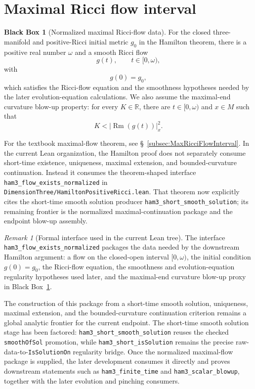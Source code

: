 \documentclass[11pt]{article}
\theoremstyle{plain}
\theoremstyle{definition}
\newtheorem{blackbox}[theorem]{Black Box}
\theoremstyle{remark}
\newtheorem{remark}[theorem]{Remark}
\newcommand{\Rm}{\operatorname{Rm}}
\newcommand{\norm}[1]{\left|#1\right|}
\newcommand{\leanref}[1]{\nolinkurl{#1}}
\newcommand{\leanfile}[1]{\nolinkurl{#1}}
\newcommand{\rffile}[1]{\leanfile{#1}}
\begin{document}
\section{Maximal Ricci flow interval}

\begin{blackbox}[Normalized maximal Ricci-flow data]
\label{bb:maximal-rf-interval}
For the closed three-manifold and positive-Ricci initial metric \(g_0\) in the
Hamilton theorem, there is a positive real number \(\omega\) and a smooth
Ricci flow
\[
  g(t),\qquad t\in[0,\omega),
\]
with
\[
  g(0)=g_0,
\]
which satisfies the Ricci-flow equation and the smoothness hypotheses needed by
the later evolution-equation calculations.  We also assume the maximal-end
curvature blow-up property: for every \(K\in\mathbb R\), there are
\(t\in[0,\omega)\) and \(x\in M\) such that
\[
  K<\norm{\Rm(g(t))}^{2}_{x}.
\]
\end{blackbox}

For the textbook maximal-flow theorem, see \S\
\ref{subsec:MaxRicciFlowInterval}.  In the current Lean organization, the
Hamilton proof does not separately consume short-time existence, uniqueness,
maximal extension, and bounded-curvature continuation.  Instead it consumes the
theorem-shaped interface \leanref{ham3_flow_exists_normalized} in
\rffile{DimensionThree/HamiltonPositiveRicci.lean}.  That theorem now explicitly
cites the short-time smooth solution producer \leanref{ham3_short_smooth_solution};
its remaining frontier is the normalized maximal-continuation package and the
endpoint blow-up assembly.

\begin{remark}[Formal interface used in the current Lean tree]
The interface \leanref{ham3_flow_exists_normalized} packages the data needed by
the downstream Hamilton argument: a flow on the closed-open interval
\([0,\omega)\), the initial condition \(g(0)=g_0\), the Ricci-flow equation,
the smoothness and evolution-equation regularity hypotheses used later, and the
maximal-end curvature blow-up proxy in Black
Box~\ref{bb:maximal-rf-interval}.

The construction of this package from a short-time smooth solution, uniqueness,
maximal extension, and the bounded-curvature continuation criterion remains a
global analytic frontier for the current endpoint.  The short-time smooth
solution stage has been factored: \leanref{ham3_short_smooth_solution} reuses
the checked \leanref{smoothOfSol} promotion, while
\leanref{ham3_short_isSolution} remains the precise raw-data-to-\leanref{IsSolutionOn}
regularity bridge.  Once the normalized maximal-flow package is supplied, the
later development consumes it directly and proves downstream statements such as
\leanref{ham3_finite_time} and \leanref{ham3_scalar_blowup}, together with the
later evolution and pinching
consumers.
\end{remark}
\end{document}
